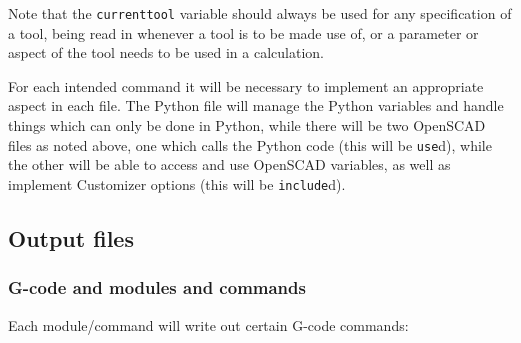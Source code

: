 \documentclass{ltxdoc}
\begin{document}
Note that the \verb|currenttool| variable should always be used for any specification 
of a tool, being read in whenever a tool is to be made use of, or a parameter or aspect
of the tool needs to be used in a calculation. %

For each intended command it will be necessary to implement an appropriate aspect in each file. 
The Python file will manage the Python variables and handle things which can only be done in 
Python, while there will be two OpenSCAD files as noted above, one which calls the Python code 
(this will be \texttt{use}d), while the other will be able to access
and use OpenSCAD variables, as well as implement Customizer options
(this will be \texttt{include}d).

\subsection{Output files}

\subsubsection{G-code and modules and commands}
 
Each module/command will write out certain G-code commands:

\bigskip
\end{document}
